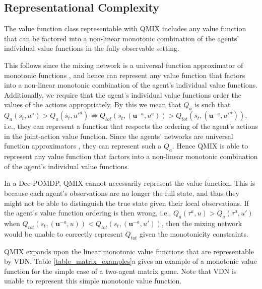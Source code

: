 \documentclass{article}
\begin{document}
\subsection{Representational Complexity}

The value function class representable with QMIX includes any value function that can be factored into a non-linear monotonic combination of the agents' individual value functions in the fully observable setting. 

This follows since the mixing network is a universal function approximator of monotonic functions \cite{Dugas_2009}, and hence can represent any value function that factors into a non-linear monotonic combination of the agent's individual value functions. Additionally, we require that the agent's individual value functions order the values of the actions appropriately. By this we mean that $Q_a$ is such that $Q_a(s_t, u^a) > Q_a(s_t, u'^a) \iff Q_{tot}(s_t, (\mathbf{u}^{-a}, u^a)) > Q_{tot}(s_t, (\mathbf{u}^{-a}, u'^a))$, i.e., they can represent a function that respects the ordering of the agent's actions in the joint-action value function. Since the agents' networks are universal function approximators \cite{pinkus1999approximation}, they can represent such a $Q_a$. Hence QMIX is able to represent any value function that factors into a non-linear monotonic combination of the agent's individual value functions. 

In a Dec-POMDP, QMIX cannot necessarily represent the value function. This is because each agent's observations are no longer the full state, and thus they might not be able to distinguish the true state given their local observations. If the agent's value function ordering is then wrong, i.e., $Q_a(\tau^a, u) > Q_a(\tau^a, u')$ when $Q_{tot}(s_t, (\mathbf{u}^{-a}, u)) < Q_{tot}(s_t, (\mathbf{u}^{-a}, u'))$, then the mixing network would be unable to correctly represent $Q_{tot}$ given the monotonicity constraints. 

QMIX expands upon the linear monotonic value functions that are representable by VDN. Table \ref{table_matrix_examples}a gives an example of a monotonic value function for the simple case of a two-agent matrix game. Note that VDN is unable to represent this simple monotonic value function.
\end{document}
